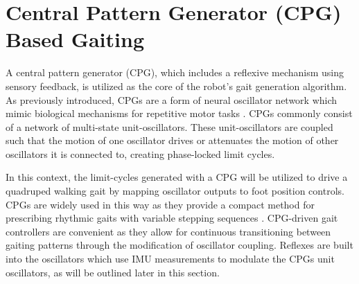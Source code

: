 	\section{Central Pattern Generator (CPG) Based Gaiting}
		\label{sec::cpg_gait_control}
		A central pattern generator (CPG), which includes a reflexive mechanism using sensory feedback, is utilized as the core of the robot's gait generation algorithm. As previously introduced, CPGs are a form of neural oscillator network which mimic biological mechanisms for repetitive motor tasks \cite{Ijspeert2008,Collins1993}. CPGs commonly consist of a network of multi-state unit-oscillators. These unit-oscillators are coupled such that the motion of one oscillator drives or attenuates the motion of other oscillators it is connected to, creating phase-locked limit cycles.

		In this context, the limit-cycles generated with a CPG will be utilized to drive a quadruped  walking gait by mapping oscillator outputs to foot position controls. CPGs are widely used in this way as they provide a compact method for prescribing rhythmic gaits with variable stepping sequences \cite{Righetti2006,Castro2008,Li2014}. CPG-driven gait controllers are convenient as they allow for continuous transitioning between gaiting patterns through the modification of oscillator coupling. Reflexes are built into the oscillators which use IMU measurements to modulate the CPGs unit oscillators, as will be outlined later in this section.

